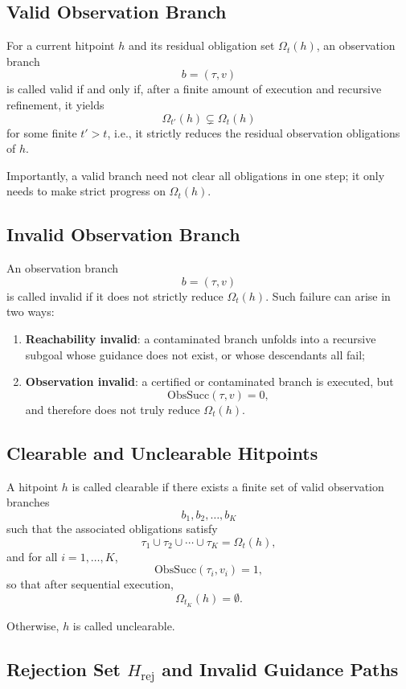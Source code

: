 \documentclass[11pt]{article}
\begin{document}
\subsection{Valid Observation Branch}

For a current hitpoint $h$ and its residual obligation set $\Omega_t(h)$, an observation branch
\[
b=(\tau,v)
\]
is called valid if and only if, after a finite amount of execution and recursive refinement, it yields
\[
\Omega_{t'}(h)\subsetneq \Omega_t(h)
\]
for some finite $t'>t$, i.e., it strictly reduces the residual observation obligations of $h$.

Importantly, a valid branch need not clear all obligations in one step; it only needs to make strict progress on $\Omega_t(h)$.

\subsection{Invalid Observation Branch}

An observation branch
\[
b=(\tau,v)
\]
is called invalid if it does not strictly reduce $\Omega_t(h)$. Such failure can arise in two ways:
\begin{enumerate}[leftmargin=2em]
    \item \textbf{Reachability invalid}: a contaminated branch unfolds into a recursive subgoal whose guidance does not exist, or whose descendants all fail;
    \item \textbf{Observation invalid}: a certified or contaminated branch is executed, but
    \[
    \mathrm{ObsSucc}(\tau,v)=0,
    \]
    and therefore does not truly reduce $\Omega_t(h)$.
\end{enumerate}

\subsection{Clearable and Unclearable Hitpoints}

A hitpoint $h$ is called clearable if there exists a finite set of valid observation branches
\[
b_1,b_2,\dots,b_K
\]
such that the associated obligations satisfy
\[
\tau_1\cup\tau_2\cup\cdots\cup\tau_K=\Omega_t(h),
\]
and for all $i=1,\dots,K$,
\[
\mathrm{ObsSucc}(\tau_i,v_i)=1,
\]
so that after sequential execution,
\[
\Omega_{t_K}(h)=\emptyset.
\]

Otherwise, $h$ is called unclearable.

\subsection{Rejection Set \texorpdfstring{$H_{\mathrm{rej}}$}{Hrej} and Invalid Guidance Paths}
\end{document}
